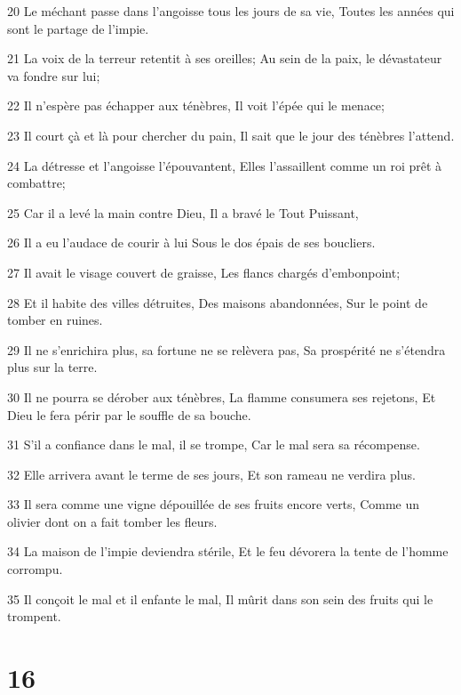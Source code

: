 \par 20 Le méchant passe dans l'angoisse tous les jours de sa vie, Toutes les années qui sont le partage de l'impie.
\par 21 La voix de la terreur retentit à ses oreilles; Au sein de la paix, le dévastateur va fondre sur lui;
\par 22 Il n'espère pas échapper aux ténèbres, Il voit l'épée qui le menace;
\par 23 Il court çà et là pour chercher du pain, Il sait que le jour des ténèbres l'attend.
\par 24 La détresse et l'angoisse l'épouvantent, Elles l'assaillent comme un roi prêt à combattre;
\par 25 Car il a levé la main contre Dieu, Il a bravé le Tout Puissant,
\par 26 Il a eu l'audace de courir à lui Sous le dos épais de ses boucliers.
\par 27 Il avait le visage couvert de graisse, Les flancs chargés d'embonpoint;
\par 28 Et il habite des villes détruites, Des maisons abandonnées, Sur le point de tomber en ruines.
\par 29 Il ne s'enrichira plus, sa fortune ne se relèvera pas, Sa prospérité ne s'étendra plus sur la terre.
\par 30 Il ne pourra se dérober aux ténèbres, La flamme consumera ses rejetons, Et Dieu le fera périr par le souffle de sa bouche.
\par 31 S'il a confiance dans le mal, il se trompe, Car le mal sera sa récompense.
\par 32 Elle arrivera avant le terme de ses jours, Et son rameau ne verdira plus.
\par 33 Il sera comme une vigne dépouillée de ses fruits encore verts, Comme un olivier dont on a fait tomber les fleurs.
\par 34 La maison de l'impie deviendra stérile, Et le feu dévorera la tente de l'homme corrompu.
\par 35 Il conçoit le mal et il enfante le mal, Il mûrit dans son sein des fruits qui le trompent.

\chapter{16}

